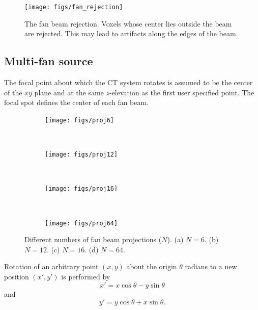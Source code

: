 \begin{figure}[tb]
  \begin{center}
   \texttt{[image: figs/fan\_rejection]}
  \end{center}
  \caption{The fan beam rejection. Voxels whose center lies outside the beam are rejected. This may lead to artifacts along the edges of the beam.}
\label{fig:fan_rejection}
\end{figure}

\subsection{Multi-fan source}
The focal point about which the CT system rotates is assumed to be the center of the $xy$ plane and at the same $z$-elevation as the first user specified point. The focal spot defines the center of each fan beam.

\begin{figure}
    \centering
    \begin{subfigure}[b]{0.2\textwidth}
        \texttt{[image: figs/proj6]}
        \caption{}
        \label{fig:proj6}
    \end{subfigure}
    ~ 
    \begin{subfigure}[b]{0.2\textwidth}
        \texttt{[image: figs/proj12]}
        \caption{}
        \label{fig:proj12}
    \end{subfigure}
    ~ 
    \begin{subfigure}[b]{0.2\textwidth}
        \texttt{[image: figs/proj16]}
        \caption{}
        \label{fig:proj16}
    \end{subfigure}
    ~
    \begin{subfigure}[b]{0.2\textwidth}
        \texttt{[image: figs/proj64]}
        \caption{}
        \label{fig:proj24}
    \end{subfigure}
    \caption{Different numbers of fan beam projections ($N$). (a) $N = 6$. (b) $N = 12$. (c) $N = 16$. (d) $N = 64$.}\label{fig:fanproj}
\end{figure}

Rotation of an arbitrary point $(x,y)$ about the origin $\theta$ radians to a new position $(x', y')$ is performed by
\begin{equation}\label{eq:xp}
x' = x \cos \theta - y \sin \theta
\end{equation}
and
\begin{equation}\label{eq:yp}
y' = y \cos \theta + x \sin \theta.
\end{equation}

